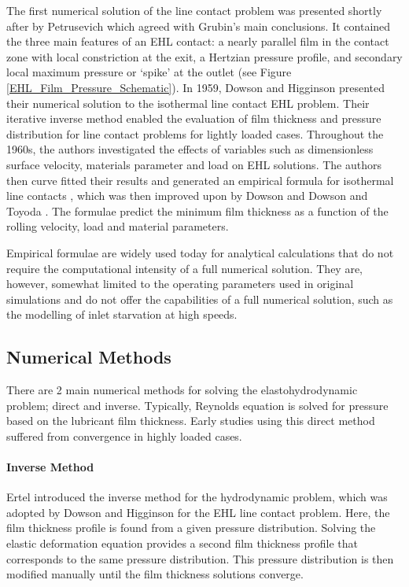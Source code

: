 The first numerical solution of the line contact problem was presented shortly after by Petrusevich \cite{Petrusovich1951} which agreed with Grubin’s main conclusions. It contained the three main features of an EHL contact: a nearly parallel film in the contact zone with local constriction at the exit, a Hertzian pressure profile, and secondary local maximum pressure or ‘spike’ at the outlet (see Figure \ref{EHL_Film_Pressure_Schematic}). In 1959, Dowson and Higginson \cite{Dowson1959} presented their numerical solution to the isothermal line contact EHL problem. Their iterative inverse method enabled the evaluation of film thickness and pressure distribution for line contact problems for lightly loaded cases. Throughout the 1960s, the authors investigated the effects of variables such as dimensionless surface velocity, materials parameter and load on EHL solutions. The authors then curve fitted their results and generated an empirical formula for isothermal line contacts \cite{Dowson1961}, which was then improved upon by Dowson \cite{Dowson1966} and Dowson and Toyoda \cite{Dowson1979}. The formulae predict the minimum film thickness as a function of the rolling velocity, load and material parameters.

Empirical formulae are widely used today for analytical calculations that do not require the computational intensity of a full numerical solution. They are, however, somewhat limited to the operating parameters used in original simulations and do not offer the capabilities of a full numerical solution, such as the modelling of inlet starvation at high speeds.

\subsection{Numerical Methods}

There are 2 main numerical methods for solving the elastohydrodynamic problem; direct and inverse. Typically, Reynolds equation is solved for pressure based on the lubricant film thickness. Early studies using this direct method suffered from convergence in highly loaded cases.

\paragraph{Inverse Method}

Ertel \cite{Ertel1939} introduced the inverse method for the hydrodynamic problem, which was adopted by Dowson and Higginson \cite{Dowson1959} for the EHL line contact problem. Here, the film thickness profile is found from a given pressure distribution. Solving the elastic deformation equation provides a second film thickness profile that corresponds to the same pressure distribution. This pressure distribution is then modified manually until the film thickness solutions converge.

